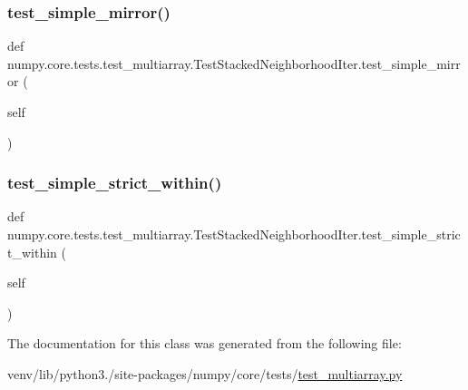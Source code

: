 \subsubsection{\texorpdfstring{test\+\_\+simple\+\_\+mirror()}{test\_simple\_mirror()}}
{\footnotesize\ttfamily def numpy.\+core.\+tests.\+test\+\_\+multiarray.\+Test\+Stacked\+Neighborhood\+Iter.\+test\+\_\+simple\+\_\+mirror (\begin{DoxyParamCaption}\item[{}]{self }\end{DoxyParamCaption})}

\mbox{\label{classnumpy_1_1core_1_1tests_1_1test__multiarray_1_1TestStackedNeighborhoodIter_abc8b7db2c78a1fd6e5b999113c2299dc}} 
\subsubsection{\texorpdfstring{test\+\_\+simple\+\_\+strict\+\_\+within()}{test\_simple\_strict\_within()}}
{\footnotesize\ttfamily def numpy.\+core.\+tests.\+test\+\_\+multiarray.\+Test\+Stacked\+Neighborhood\+Iter.\+test\+\_\+simple\+\_\+strict\+\_\+within (\begin{DoxyParamCaption}\item[{}]{self }\end{DoxyParamCaption})}



The documentation for this class was generated from the following file\+:\begin{DoxyCompactItemize}
\item 
venv/lib/python3./site-\/packages/numpy/core/tests/\hyperlink{core_2tests_2test__multiarray_8py}{test\+\_\+multiarray.\+py}\end{DoxyCompactItemize}
